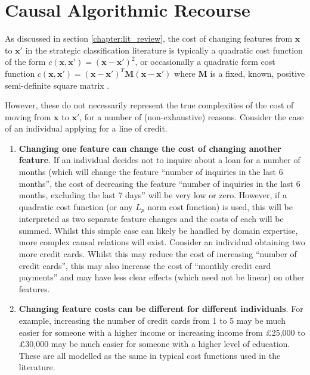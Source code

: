 \chapter{Causal Algorithmic Recourse}

As discussed in section \ref{chapter:lit_review}, the cost of changing features from $\mathbf{x}$ to $\mathbf{x}'$ in the strategic classification literature is typically a quadratic cost function of the form $c(\mathbf{x}, \mathbf{x}') = (\mathbf{x} - \mathbf{x}')^2$, or occasionally a quadratic form cost function $c(\mathbf{x}, \mathbf{x}') = (\mathbf{x-x'})^T\mathbf{M}(\mathbf{x-x'})$ where $\mathbf{M}$ is a fixed, known, positive semi-definite square matrix \citep{bechavodInformationDiscrepancyStrategic2022}.

However, these do not necessarily represent the true complexities of the cost of moving from $\mathbf{x}$ to $\mathbf{x}'$, for a number of (non-exhaustive) reasons. Consider the case of an individual applying for a line of credit.

\begin{enumerate}
	\item \textbf{Changing one feature can change the cost of changing another feature}. If an individual decides not to inquire about a loan for a number of months (which will change the feature ``number of inquiries in the last 6 months'', the cost of decreasing the feature ``number of inquiries in the last 6 months, excluding the last 7 days'' will be very low or zero. However, if a quadratic cost function (or any $L_p$ norm cost function) is used, this will be interpreted as two separate feature changes and the costs of each will be summed. Whilst this simple case can likely be handled by domain expertise, more complex causal relations will exist. Consider an individual obtaining two more credit cards. Whilst this may reduce the cost of increasing ``number of credit cards'', this may also increase the cost of ``monthly credit card payments'' and may have less clear effects (which need not be linear) on other features.
	
	\item \textbf{Changing feature costs can be different for different individuals}. For example, increasing the number of credit cards from 1 to 5 may be much easier for someone with a higher income or increasing income from £25,000 to £30,000 may be much easier for someone with a higher level of education. These are all modelled as the same in typical cost functions used in the literature. 
\end{enumerate}

